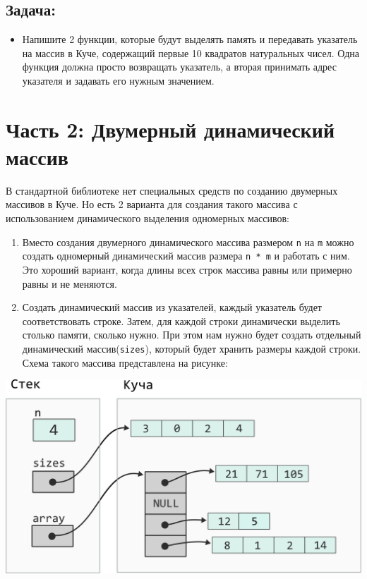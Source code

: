 \documentclass{article}
\begin{document}
\subsection*{Задача:}
\begin{itemize}
\item Напишите 2 функции, которые будут выделять память и передавать указатель на массив в Куче, содержащий первые 10 квадратов натуральных чисел. Одна функция должна просто возвращать указатель, а вторая принимать адрес указателя и задавать его нужным значением.
\end{itemize}

\newpage
\section*{Часть 2: Двумерный динамический массив}
В стандартной библиотеке нет специальных средств по созданию двумерных массивов в Куче. Но есть 2 варианта для создания
такого массива с использованием динамического выделения одномерных массивов:
\begin{enumerate}
\item Вместо создания двумерного динамического массива размером \texttt{n} на \texttt{m} можно создать одномерный динамический массив размера \texttt{n * m} и работать с ним.
Это хороший вариант, когда длины всех строк массива равны или примерно равны и не меняются.
\item Создать динамический массив из указателей, каждый указатель будет 
соответствовать строке. Затем, для каждой строки динамически выделить столько памяти,
сколько нужно. При этом нам нужно будет создать отдельный динамический массив(\texttt{sizes}), который будет хранить
размеры каждой строки. Схема такого массива представлена на рисунке:
\end{enumerate}
\begin{center}
\includegraphics[scale=0.9]{../images/two_dim_dynamic_array.png}
\end{center}
\end{document}

